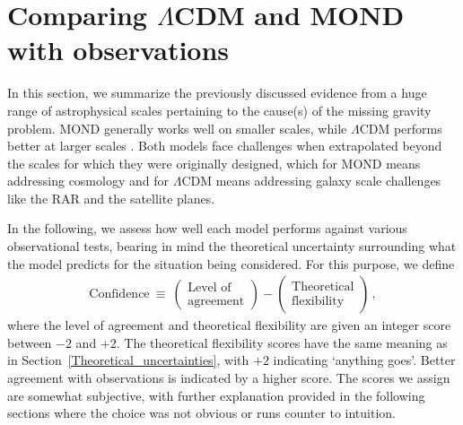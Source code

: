 \documentclass[fleqn,usenatbib,useAMS,onecolumn]{mnras} %
\begin{document}
\section{Comparing \texorpdfstring{$\Lambda$}{L}CDM and MOND with observations}
\label{Comparison_with_observations}

In this section, we summarize the previously discussed evidence from a huge range of astrophysical scales pertaining to the cause(s) of the missing gravity problem. MOND generally works well on smaller scales, while $\Lambda$CDM performs better at larger scales \citep{Massimi_2018}. Both models face challenges when extrapolated beyond the scales for which they were originally designed, which for MOND means addressing cosmology and for $\Lambda$CDM means addressing galaxy scale challenges like the RAR and the satellite planes.

In the following, we assess how well each model performs against various observational tests, bearing in mind the theoretical uncertainty surrounding what the model predicts for the situation being considered. For this purpose, we define
\begin{eqnarray}
	\text{Confidence} ~\equiv~ \begin{pmatrix} \text{Level of} \\ \text{agreement} \end{pmatrix} - \begin{pmatrix} \text{Theoretical} \\ \text{flexibility} \end{pmatrix} \, ,
	\label{Confidence_definition}
\end{eqnarray}
where the level of agreement and theoretical flexibility are given an integer score between $-2$ and $+2$. The theoretical flexibility scores have the same meaning as in Section~\ref{Theoretical_uncertainties}, with $+2$ indicating `anything goes'. Better agreement with observations is indicated by a higher score. The scores we assign are somewhat subjective, with further explanation provided in the following sections where the choice was not obvious or runs counter to intuition.
\end{document}
